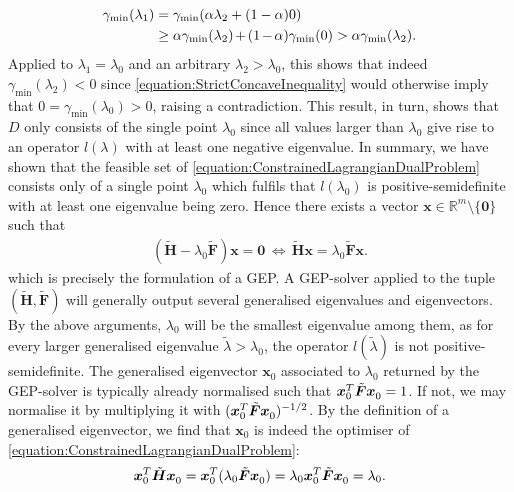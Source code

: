 \documentclass[10pt,conference]{IEEEtran}
\newcommand*{\R}{\mathbb{R}}          %
\newcommand*{\transpose}{T}           %
\begin{document}
\begin{align}\label{equation:StrictConcaveInequality}
    \begin{split}
        \gamma_{\min}(\lambda_{1}) &= \gamma_{\min}(\alpha \lambda_{2} + (1 - \alpha) 0) \\
        & \geq \alpha \gamma_{\min}(\lambda_{2})\hspace*{-1pt} +\hspace*{-1pt} (1\hspace*{-1pt} -\hspace*{-1pt} \alpha) \gamma_{\min}(0) > \alpha \gamma_{\min}(\lambda_{2}).
    \end{split}
\end{align}
Applied to $\lambda_{1} = \lambda_{0}$ and an arbitrary $\lambda_{2} > \lambda_{0}$, this shows that indeed $\gamma_{\min}(\lambda_{2}) < 0$ since \eqref{equation:StrictConcaveInequality} would otherwise imply that $0 = \gamma_{\min}(\lambda_{0}) > 0$, raising a contradiction.
This result, in turn, shows that $D$ only consists of the single point $\lambda_{0}$ since all values larger than $\lambda_{0}$ give rise to an operator $l(\lambda)$ with at least one negative eigenvalue.
In summary, we have shown that the feasible set of \eqref{equation:ConstrainedLagrangianDualProblem} consists only of a single point $\lambda_{0}$ which fulfils that $l(\lambda_{0})$ is positive-semidefinite with at least one eigenvalue being zero.
Hence there exists a vector $\bm{x} \in \R^{m} \setminus \{\bm{0}\}$ such that
\begin{align}\label{equation:GeneralisedEigenvalueProblem}
    (\tilde{\bm{H}} - \lambda_{0} \tilde{\bm{F}}) \bm{x} = \bm{0}\, \Leftrightarrow\, \tilde{\bm{H}} \bm{x} = \lambda_{0} \tilde{\bm{F}} \bm{x}.
\end{align}
which is precisely the formulation of a GEP.
A GEP-solver applied to the tuple $(\tilde{\bm{H}}, \tilde{\bm{F}})$ will generally output several generalised eigenvalues and eigenvectors.
By the above arguments, $\lambda_{0}$ will be the smallest eigenvalue among them, as for every larger generalised eigenvalue $\tilde{\lambda} > \lambda_{0}$, the operator $l(\tilde{\lambda})$ is not positive-semidefinite.
The generalised eigenvector $\bm{x}_{0}$ associated to $\lambda_{0}$ returned by the GEP-solver is typically already normalised such that $\bm{x}_{0}^{\transpose} \tilde{\bm{F}} \bm{x}_{0}^{\vphantom{\transpose}} = 1$.
If not, we may normalise it by multiplying it with $(\bm{x}_{0}^{\transpose} \tilde{\bm{F}} \bm{x}_{0}^{\vphantom{\transpose}})^{-1 / 2}$.
By the definition of a generalised eigenvector, we find that $\bm{x}_{0}$ is indeed the optimiser of \eqref{equation:ConstrainedLagrangianDualProblem}:
\begin{align}\label{equation:OptimalityCheck}
    \bm{x}_{0}^{\transpose} \tilde{\bm{H}} \bm{x}_{0}^{\vphantom{\transpose}} = \bm{x}_{0}^{\transpose} (\lambda_{0} \tilde{\bm{F}} \bm{x}_{0}^{\vphantom{\transpose}}) = \lambda_{0} \bm{x}_{0}^{\transpose} \tilde{\bm{F}} \bm{x}_{0}^{\vphantom{\transpose}} = \lambda_{0}.
\end{align}
\end{document}

